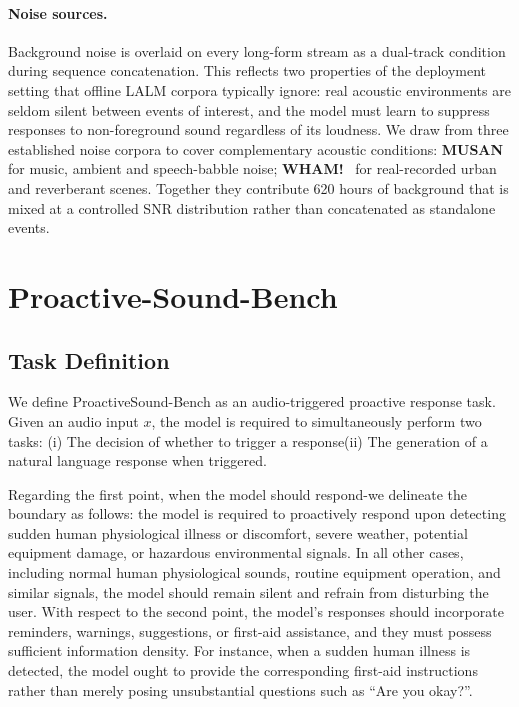 \documentclass{article}
\begin{document}
\paragraph{Noise sources.}
Background noise is overlaid on every long-form stream as a dual-track condition during
sequence concatenation. This reflects two
properties of the deployment setting that offline LALM corpora typically ignore: real
acoustic environments are seldom silent between events of interest, and the model must
learn to suppress responses to non-foreground sound regardless of its loudness. We draw
from three established noise corpora to cover complementary acoustic conditions:
\textbf{MUSAN}~\citep{snyder2015musan} for music, ambient and speech-babble noise;
\textbf{WHAM!}~\citep{wichern2019wham} for real-recorded urban and reverberant scenes. Together they
contribute 620 hours of background that is mixed at a controlled SNR distribution rather
than concatenated as standalone events.




\newpage
\section{Proactive-Sound-Bench}
\label{app:bench}

\subsection{Task Definition}
\label{app:bench:task}
We define ProactiveSound-Bench as an audio-triggered proactive response task. Given an audio input $x$, the model is required to simultaneously perform two tasks: (i) The decision of whether to trigger a response(ii) The generation of a natural language response when triggered.

Regarding the first point, when the model should respond-we delineate the boundary as follows: the model is required to proactively respond upon detecting sudden human physiological illness or discomfort, severe weather, potential equipment damage, or hazardous environmental signals. In all other cases, including normal human physiological sounds, routine equipment operation, and similar signals, the model should remain silent and refrain from disturbing the user.  
With respect to the second point, the model’s responses should incorporate reminders, warnings, suggestions, or first-aid assistance, and they must possess sufficient information density. For instance, when a sudden human illness is detected, the model ought to provide the corresponding first-aid instructions rather than merely posing unsubstantial questions such as “Are you okay?”.
\end{document}
